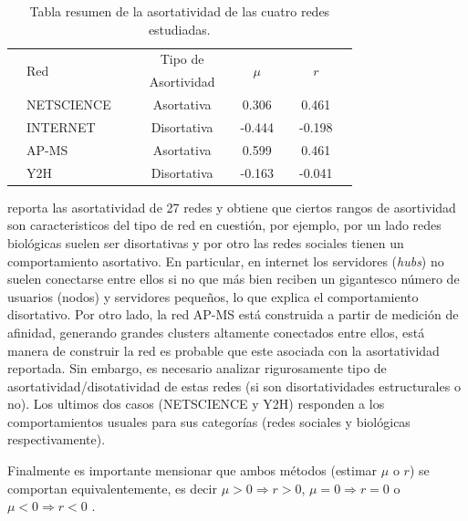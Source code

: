 \begin{table}[!ht]
    \centering
    \caption{\label{tab:assort} Tabla resumen de la asortatividad de las cuatro redes estudiadas.}
    {\scriptsize
    \begin{tabularx}{1\columnwidth}{XlX|XcXcXcX}
        \hline\hline
        & \multirow{2}{*}{Red}  &&& Tipo de     && \multirow{2}{*}{$\mu$}   && \multirow{2}{*}{$r$} &\\ 
        &                       &&& Asortividad &&                          &&                      &\\ 
        \hline
        & NETSCIENCE           &&& Asortativa   &&   0.306                  &&  0.461                &\\
        & INTERNET             &&& Disortativa  &&  -0.444                  && -0.198                &\\
        & AP-MS                &&& Asortativa   &&   0.599                  &&  0.461                &\\
        & Y2H                  &&& Disortativa  &&  -0.163                  && -0.041                &\\
        \hline\hline
    \end{tabularx}
    }
\end{table}

\citet{newman2003} reporta las asortatividad de 27 redes y obtiene que ciertos rangos de asortividad son caracteristicos del 
tipo de red en cuesti\'on, por ejemplo, por un lado redes biol\'ogicas suelen ser disortativas y por otro las redes sociales
tienen un comportamiento asortativo. En particular, en internet los  servidores (\textit{hubs}) no suelen conectarse 
entre ellos si no que m\'as bien reciben un gigantesco n\'umero de usuarios (nodos) y servidores peque\~nos, lo que explica
el comportamiento disortativo. Por otro lado, la red AP-MS est\'a construida a partir de medici\'on de afinidad, generando
grandes clusters altamente conectados entre ellos, est\'a manera de construir la red es probable que este asociada con la 
asortatividad reportada. Sin embargo, es necesario analizar rigurosamente tipo de asortatividad/disotatividad de estas redes
(si son disortatividades estructurales o no). Los ultimos dos casos (NETSCIENCE y Y2H) responden a los comportamientos
usuales para sus categor\'ias (redes sociales y biol\'ogicas respectivamente).

Finalmente es importante mensionar que ambos m\'etodos (estimar $\mu$ o $r$) se comportan equivalentemente, es decir
$\mu > 0 \Rightarrow r>0$, $\mu = 0 \Rightarrow r = 0$ o $\mu < 0 \Rightarrow r < 0$ \citep{barabasi}.
